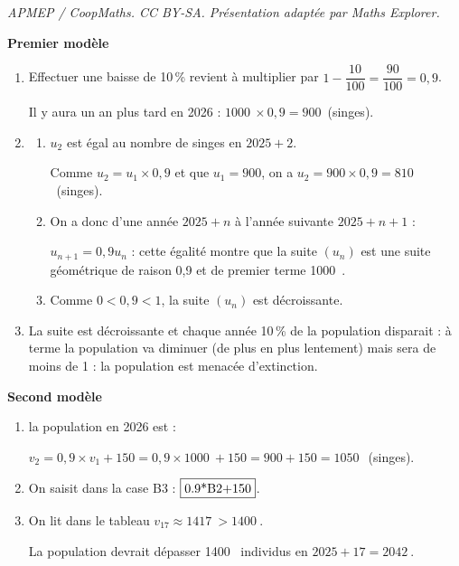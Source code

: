 \documentclass[10pt]{article}
\providecommand{\np}[2][]{{#2~#1}}
\begin{document}
\noindent\textit{APMEP / CoopMaths. CC BY-SA. Présentation adaptée par Maths Explorer.}\par\medskip
\medskip

\textbf{Premier modèle}

\medskip

\begin{enumerate}
\item Effectuer une baisse de 10\,\% revient à multiplier par $1 - \dfrac{10}{100} = \dfrac{90}{100} = 0,9$.

Il y aura un an plus tard en 2026 : $\np{1000} \times 0,9 = 900$~(singes).
\item
	\begin{enumerate}
		\item $u_2$ est égal au nombre de singes en $2025 + 2$.

Comme $u_2 = u_1 \times 0,9$ et que $u_1 = 900$, on a $u_2 = 900 \times 0,9 = 810$~(singes).
		\item On a donc d'une année $2025 + n$ à l'année suivante $2025 + n + 1$ :

$u_{n+1} = 0,9 u_n$ : cette égalité montre que la suite $(u_n)$ est une suite géométrique de raison 0,9 et de premier terme \np{1000}.
		\item Comme $0 < 0,9 < 1$, la suite $(u_n)$ est décroissante.
	\end{enumerate}
\item La suite est décroissante et chaque année 10\,\% de la population disparait : à terme la population va diminuer (de plus en plus lentement) mais sera de moins de 1 : la population est menacée d'extinction. 
\end{enumerate}

\medskip

\textbf{Second modèle}

\medskip

\begin{enumerate}
\item la population en 2026 est :

$v_2 = 0,9 \times v_1 + 150 = 0,9 \times \np{1000} + 150 = 900 + 150 = \np{1050}$~(singes).
\item On saisit dans la case B3 : $\fbox{0.9*B2+150}$.
\item On lit dans le tableau $v_{17} \approx \np{1417} > \np{1400}$.

La population devrait dépasser \np{1400} individus en $2025 + 17 = \np{2042}$.
\end{enumerate}

\bigskip
\end{document}
